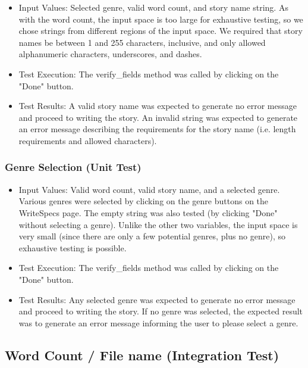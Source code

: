 \documentclass[12pt]{article}
\begin{document}
\begin{itemize}
\item Input Values: Selected genre, valid word count, and story name string. As with the word count, the input space is too large for exhaustive testing, so we chose strings from different regions of the input space. We required that story names be between 1 and 255 characters, inclusive, and only allowed alphanumeric characters, underscores, and dashes.
\item Test Execution: The verify\_fields method was called by clicking on the "Done" button.
\item Test Results: A valid story name was expected to generate no error message and proceed to writing the story. An invalid string was expected to generate an error message describing the requirements for the story name (i.e. length requirements and allowed characters).
\end{itemize}

\subsubsection{Genre Selection (Unit Test)}

\begin{itemize}
\item Input Values: Valid word count, valid story name, and a selected genre. Various genres were selected by clicking on the genre buttons on the WriteSpecs page. The empty string was also tested (by clicking "Done" without selecting a genre). Unlike the other two variables, the input space is very small (since there are only a few potential genres, plus no genre), so exhaustive testing is possible.
\item Test Execution: The verify\_fields method was called by clicking on the "Done" button.
\item Test Results: Any selected genre was expected to generate no error message and proceed to writing the story. If no genre was selected, the expected result was to generate an error message informing the user to please select a genre.
\end{itemize}

\subsection{Word Count / File name (Integration Test)}
\end{document}
